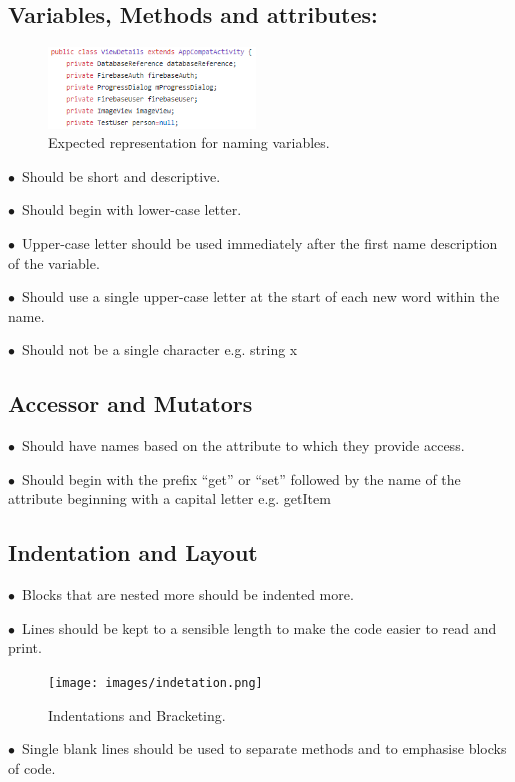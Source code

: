 \documentclass[english]{article}
\begin{document}
		\subsection{Variables, Methods and attributes:}
		\begin{figure}
			\caption{Expected representation for naming variables.}\label{wrap-fig:1}
			\includegraphics[width=5.5cm]{images/variables.png}
		\end{figure} 
			$\bullet$\ Should be short and descriptive.\par
			$\bullet$\ Should begin with lower-case letter.\par
$\bullet$\ Upper-case letter should be used immediately after the first name description of the variable.\par
$\bullet$\ Should use a single upper-case letter at the start of each new word within the name.\par
$\bullet$\ Should not be a single character e.g. string x  \par


                                	

		\subsection{Accessor and Mutators}
$\bullet$\  Should have names based on the attribute to which they provide access.\par
$\bullet$\ Should begin with the prefix “get” or “set” followed by the name of the attribute beginning with a capital letter e.g. getItem \par
				
		\subsection{Indentation and Layout}
		$\bullet$\ Blocks that are nested more should be indented more. \par
		
$\bullet$\ Lines should be kept to a sensible length to make the code easier to read and print.\par	
\begin{figure}
	\caption{Indentations and Bracketing.}
	\label{wrap-fig:2}
	\texttt{[image: images/indetation.png]}
\end{figure} 
	$\bullet$\ Single blank lines should be used to separate methods and to emphasise blocks of code.\par	
		
\end{document}
